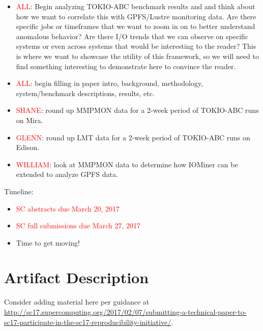 \documentclass[conference,10pt,compsocconf]{IEEEtran}
\begin{document}
\begin{itemize}
    \item \textcolor{red}{ALL}: Begin analyzing TOKIO-ABC benchmark results and
    and think about how we want to correlate this with GPFS/Lustre monitoring
    data. Are there specific jobs or timeframes that we want to zoom in on
    to better understand anomalous behavior? Are there I/O trends that we
    can observe on specific systems or even across systems that would be
    interesting to the reader? This is where we want to showcase the utility
    of this framework, so we will need to find something interesting to demonstrate
    here to convince the reader. 

    \item \textcolor{red}{ALL}: begin filling in paper intro, background,
    methodology, system/benchmark descriptions, results, etc.

    \item \textcolor{red}{SHANE}: round up MMPMON data for a 2-week period
    of TOKIO-ABC runs on Mira.

    \item \textcolor{red}{GLENN}: round up LMT data for a 2-week period of
    TOKIO-ABC runs on Edison.

    \item \textcolor{red}{WILLIAM}: look at MMPMON data to determine how
    IOMiner can be extended to analyze GPFS data. 
\end{itemize}

Timeline:
\begin{itemize}
    \item \textcolor{red}{SC abstracts due March 20, 2017}
    \item \textcolor{red}{SC full submissions due March 27, 2017}
    \item Time to get moving!
\end{itemize}
%





\appendix

\section{Artifact Description}

Consider adding material here per guidance at
\url{http://sc17.supercomputing.org/2017/02/07/submitting-a-technical-paper-to-sc17-participate-in-the-sc17-reproducibility-initiative/}.
\end{document}
